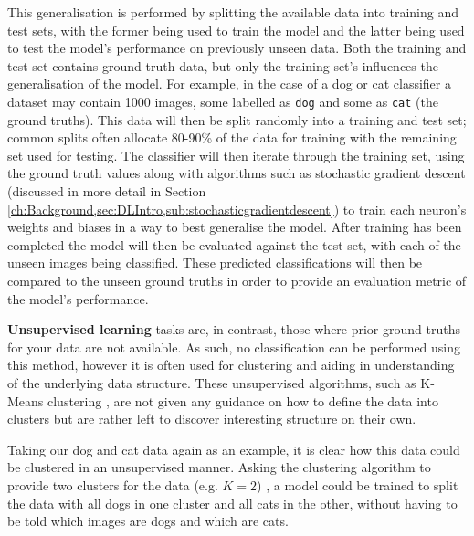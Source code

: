 This generalisation is performed by splitting the available data into training and test sets, with the former being used to train the model and the latter being used to test the model's performance on previously unseen data. Both the training and test set contains ground truth data, but only the training set's influences the generalisation of the model. For example, in the case of a dog or cat classifier a dataset may contain 1000 images, some labelled as \texttt{dog} and some as \texttt{cat} (the ground truths). This data will then be split randomly into a training and test set; common splits often allocate 80-90\% of the data for training with the remaining set used for testing. The classifier will then iterate through the training set, using the ground truth values along with algorithms such as stochastic gradient descent (discussed in more detail in Section \ref{ch:Background,sec:DLIntro,sub:stochasticgradientdescent}) to train each neuron's weights and biases in a way to best generalise the model. After training has been completed the model will then be evaluated against the test set, with each of the unseen images being classified. These predicted classifications will then be compared to the unseen ground truths in order to provide an evaluation metric of the model's performance. 

\textbf{Unsupervised learning} tasks are, in contrast, those where prior ground truths for your data are not available. As such, no classification can be performed using this method, however it is often used for clustering and aiding in understanding of the underlying data structure. These unsupervised algorithms, such as K-Means clustering \cite{hartigan_algorithm_1979}, are not given any guidance on how to define the data into clusters but are rather left to discover interesting structure on their own. 

Taking our dog and cat data again as an example, it is clear how this data could be clustered in an unsupervised manner. Asking the clustering algorithm to provide two clusters for the data  (e.g. $K = 2$) , a model could be trained to split the data with all dogs in one cluster and all cats in the other, without having to be told which images are dogs and which are cats. 

